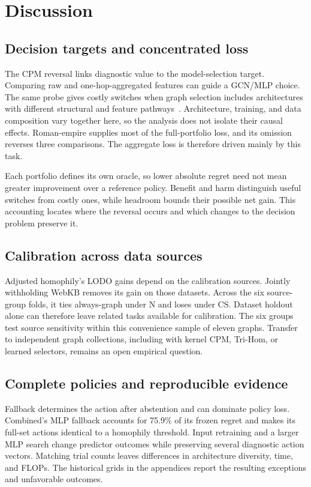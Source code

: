 \section{Discussion}
\label{sec:discussion}

\subsection{Decision targets and concentrated loss}
\label{sec:mismatch}

The CPM reversal links diagnostic value to the model-selection target. Comparing raw and one-hop-aggregated features can guide a GCN/MLP choice. The same probe gives costly switches when graph selection includes architectures with different structural and feature pathways~\citep{zhu2020beyond,lim2021linkx}. Architecture, training, and data composition vary together here, so the analysis does not isolate their causal effects. Roman-empire supplies most of the full-portfolio loss, and its omission reverses three comparisons. The aggregate loss is therefore driven mainly by this task.

Each portfolio defines its own oracle, so lower absolute regret need not mean greater improvement over a reference policy. Benefit and harm distinguish useful switches from costly ones, while headroom bounds their possible net gain. This accounting locates where the reversal occurs and which changes to the decision problem preserve it.

\subsection{Calibration across data sources}

Adjusted homophily's LODO gains depend on the calibration sources. Jointly withholding WebKB removes its gain on those datasets. Across the six source-group folds, it ties always-graph under N and loses under CS. Dataset holdout alone can therefore leave related tasks available for calibration. The six groups test source sensitivity within this convenience sample of eleven graphs. Transfer to independent graph collections, including with kernel CPM, Tri-Hom, or learned selectors, remains an open empirical question.

\subsection{Complete policies and reproducible evidence}

Fallback determines the action after abstention and can dominate policy loss. Combined's MLP fallback accounts for 75.9\% of its frozen regret and makes its full-set actions identical to a homophily threshold. Input retraining and a larger MLP search change predictor outcomes while preserving several diagnostic action vectors. Matching trial counts leaves differences in architecture diversity, time, and FLOPs. The historical grids in the appendices report the resulting exceptions and unfavorable outcomes.

